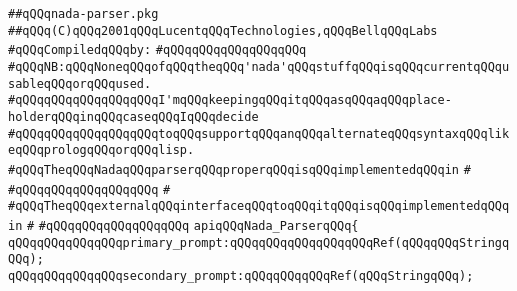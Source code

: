 \label{src/lib/compiler/front/parser/main/nada-parser.pkg}
\verb|##qQQqnada-parser.pkg|\newline
\verb|##qQQq(C)qQQq2001qQQqLucentqQQqTechnologies,qQQqBellqQQqLabs|\newline
\newline
\verb|#qQQqCompiledqQQqby:|\newline
\verb|#qQQqqQQqqQQqqQQqqQQq|\newline
\newline
\verb|#qQQqNB:qQQqNoneqQQqofqQQqtheqQQq'nada'qQQqstuffqQQqisqQQqcurrentqQQqusableqQQqorqQQqused.|\newline
\verb|#qQQqqQQqqQQqqQQqqQQqI'mqQQqkeepingqQQqitqQQqasqQQqaqQQqplace-holderqQQqinqQQqcaseqQQqIqQQqdecide|\newline
\verb|#qQQqqQQqqQQqqQQqqQQqtoqQQqsupportqQQqanqQQqalternateqQQqsyntaxqQQqlikeqQQqprologqQQqorqQQqlisp.|\newline
\newline
\newline
\newline
\verb|#qQQqTheqQQqNadaqQQqparserqQQqproperqQQqisqQQqimplementedqQQqin|\newline
\verb|#|\newline
\verb|#qQQqqQQqqQQqqQQqqQQq|\newline
\verb|#|\newline
\verb|#qQQqTheqQQqexternalqQQqinterfaceqQQqtoqQQqitqQQqisqQQqimplementedqQQqin|\newline
\verb|#|\newline
\verb|#qQQqqQQqqQQqqQQqqQQq|\newline
\newline
\newline
\newline
\verb|apiqQQqNada_ParserqQQq{|\newline
\newline
\verb|qQQqqQQqqQQqqQQqprimary_prompt:qQQqqQQqqQQqqQQqqQQqRef(qQQqqQQqStringqQQq);|\newline
\verb|qQQqqQQqqQQqqQQqsecondary_prompt:qQQqqQQqqQQqRef(qQQqStringqQQq);|\newline
\newline
